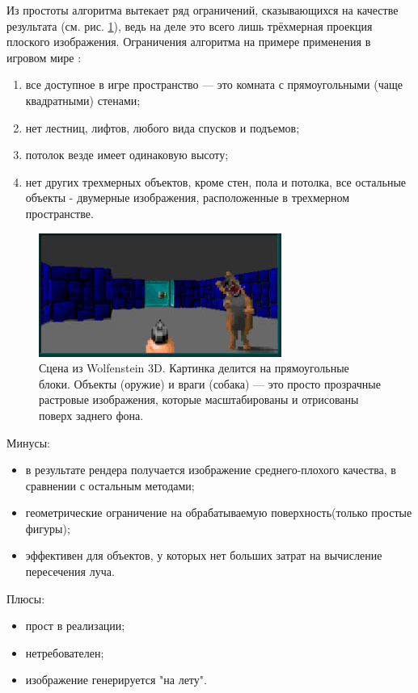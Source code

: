 Из простоты алгоритма вытекает ряд ограничений, сказывающихся на качестве результата (см. рис. \ref{fig:raycast_game}), ведь на деле это
всего лишь трёхмерная проекция плоского изображения.
Ограничения алгоритма на примере применения в игровом мире \cite{article:who_to_work_raytrace}: 
\begin{enumerate}
  \item все доступное в игре пространство — это комната с прямоугольными (чаще квадратными) стенами;
  \item нет лестниц, лифтов, любого вида спусков и подъемов;
  \item потолок везде имеет одинаковую высоту;
  \item нет других трехмерных объектов, кроме стен, пола и потолка, все остальные объекты - двумерные изображения, расположенные в трехмерном пространстве.
\end{enumerate}
\begin{figure}
  \centering
  \includegraphics[scale=1]{inc/img/raycast_game}
  \caption{Сцена из Wolfenstein 3D. Картинка делится на прямоугольные блоки. Объекты (оружие) и враги (собака) — это просто прозрачные растровые изображения, которые масштабированы и отрисованы поверх заднего фона.}
  \label{fig:raycast_game}
\end{figure}

Минусы:
\begin{itemize}
  \item в результате рендера получается изображение среднего-плохого качества, в сравнении с остальным методами;
  \item геометрические ограничение на обрабатываемую поверхность(только простые фигуры);
  \item эффективен для объектов, у которых нет больших затрат на вычисление пересечения луча.
\end{itemize}

Плюсы:  
\begin{itemize}
  \item прост в реализации;
  \item нетребователен;
  \item изображение генерируется "на лету".
\end{itemize}
